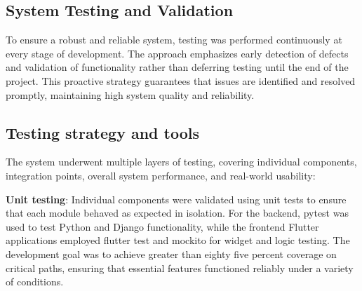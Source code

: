 



\subsection{System Testing and Validation}
To ensure a robust and reliable system, testing was performed continuously at
every stage of development. The approach emphasizes early detection of defects
and validation of functionality rather than deferring testing until the end of
the project. This proactive strategy guarantees that issues are identified and
resolved promptly, maintaining high system quality and reliability.


\subsection{Testing strategy and tools}
The system underwent multiple layers of testing, covering individual components,
integration points, overall system performance, and real-world usability:


\textbf{Unit testing}: Individual components were validated using unit tests to ensure that
each module behaved as expected in isolation. For the backend, pytest was used
to test Python and Django functionality, while the frontend Flutter applications
employed flutter test and mockito for widget and logic testing. The development
goal was to achieve greater than eighty five percent coverage on critical paths,
ensuring that essential features functioned reliably under a variety of
conditions.



